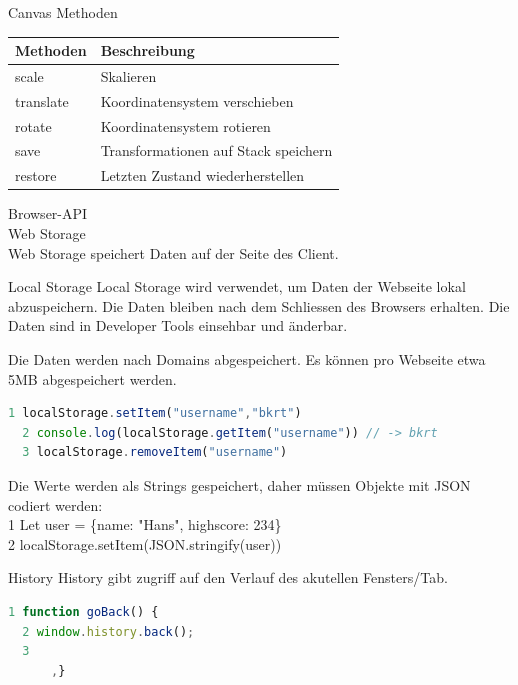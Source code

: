   Canvas Methoden
  
  \begin{center}
  \begin{tabular}{|l|l|}
  \hline
  Methoden & Beschreibung \\
  \hline
  scale & Skalieren \\
  \hline
  translate & Koordinatensystem verschieben \\
  \hline
  rotate & Koordinatensystem rotieren \\
  \hline
  save & Transformationen auf Stack speichern \\
  \hline
  restore & Letzten Zustand wiederherstellen \\
  \hline
  \end{tabular}
  \end{center}
  
  Browser-API\\
  Web Storage\\
  Web Storage speichert Daten auf der Seite des Client.
  
  \begin{definition}{Local Storage}
  Local Storage wird verwendet, um Daten der Webseite lokal abzuspeichern. Die Daten bleiben nach dem Schliessen des Browsers erhalten. Die Daten sind in Developer Tools einsehbar und änderbar.
  
  Die Daten werden nach Domains abgespeichert. Es können pro Webseite etwa 5MB abgespeichert werden.
  
  \begin{lstlisting}[language=JavaScript, style=basesmol]
  1 localStorage.setItem("username","bkrt")
  2 console.log(localStorage.getItem("username")) // -> bkrt
  3 localStorage.removeItem("username")
  \end{lstlisting}
\end{definition}
  
  Die Werte werden als Strings gespeichert, daher müssen Objekte mit JSON codiert werden:\\
  1 Let user = \{name: "Hans", highscore: 234\}\\
  2 localStorage.setItem(JSON.stringify(user))
  
  \begin{definition}{History}
  History gibt zugriff auf den Verlauf des akutellen Fensters/Tab.
  
  \begin{lstlisting}[language=JavaScript, style=basesmol]
  1 function goBack() {
  2 window.history.back();
  3
      ,}
  \end{lstlisting}
\end{definition}
  
